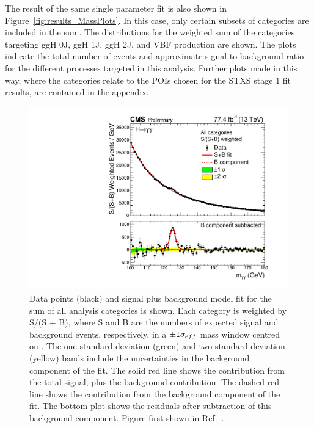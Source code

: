 The result of the same single parameter fit is also shown in Figure~\ref{fig:results_MassPlots}.
In this case, only certain subsets of categories are included in the sum.
The \mgg distributions for the weighted sum of the categories targeting 
ggH 0J, ggH 1J, ggH 2J, and VBF production are shown.
The plots indicate the total number of events and approximate signal to background ratio
for the different processes targeted in this analysis.
Further plots made in this way, 
where the categories relate to the POIs chosen for the STXS stage 1 fit results, 
are contained in the appendix. %

\begin{figure}[hptb]
  \centering
  \includegraphics[width=\textwidth]{Figures/Results/MassPlot.pdf}
  \caption[Signal plus background fit to data, summed over all analysis categories.]
  {
    Data points (black) and signal plus background model fit 
    for the sum of all analysis categories is shown. 
    Each category is weighted by S/(S + B), 
    where S and B are the numbers of expected signal and background events, respectively, 
    in a $\pm 1 \sigma_{eff}$ mass window centred on \mH. 
    The one standard deviation (green) and two standard deviation (yellow) bands 
    include the uncertainties in the background component of the fit. 
    The solid red line shows the contribution from the total signal, plus the background contribution. 
    The dashed red line shows the contribution from the background component of the fit. 
    The bottom plot shows the residuals after subtraction of this background component.
    Figure first shown in Ref.~\cite{HIG-18-029}.
  }
  \label{fig:results_MassPlot}
\end{figure}

